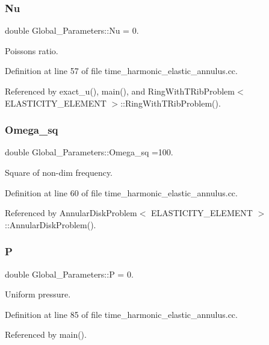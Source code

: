 \subsubsection{\texorpdfstring{Nu}{Nu}}
{\footnotesize\ttfamily double Global\+\_\+\+Parameters\+::\+Nu = 0.}



Poisson\textquotesingle{}s ratio. 



Definition at line 57 of file time\+\_\+harmonic\+\_\+elastic\+\_\+annulus.\+cc.



Referenced by exact\+\_\+u(), main(), and Ring\+With\+T\+Rib\+Problem$<$ E\+L\+A\+S\+T\+I\+C\+I\+T\+Y\+\_\+\+E\+L\+E\+M\+E\+N\+T $>$\+::\+Ring\+With\+T\+Rib\+Problem().

\mbox{\label{namespaceGlobal__Parameters_af9e1e178dfb7f5e35b452599bd4c4324}} 
\subsubsection{\texorpdfstring{Omega\+\_\+sq}{Omega\_sq}}
{\footnotesize\ttfamily double Global\+\_\+\+Parameters\+::\+Omega\+\_\+sq =100.}



Square of non-\/dim frequency. 



Definition at line 60 of file time\+\_\+harmonic\+\_\+elastic\+\_\+annulus.\+cc.



Referenced by Annular\+Disk\+Problem$<$ E\+L\+A\+S\+T\+I\+C\+I\+T\+Y\+\_\+\+E\+L\+E\+M\+E\+N\+T $>$\+::\+Annular\+Disk\+Problem().

\mbox{\label{namespaceGlobal__Parameters_a31fb55c20db4aa0127aafa20f0d76731}} 
\subsubsection{\texorpdfstring{P}{P}}
{\footnotesize\ttfamily double Global\+\_\+\+Parameters\+::P = 0.}



Uniform pressure. 



Definition at line 85 of file time\+\_\+harmonic\+\_\+elastic\+\_\+annulus.\+cc.



Referenced by main().

